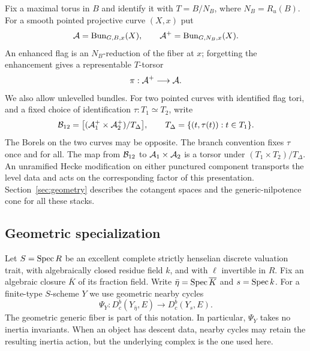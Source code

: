 Fix a maximal torus in $B$ and identify it with $T=B/N_B$, where
$N_B=R_u(B)$.  For a smooth pointed projective curve $(X,x)$ put
\[
 \mathcal A=\operatorname{Bun}_{G,B,x}(X),\qquad
 \mathcal A^+=\operatorname{Bun}_{G,N_B,x}(X).
\]
An enhanced flag is an $N_B$-reduction of the fiber at $x$; forgetting the
enhancement gives a representable $T$-torsor
\begin{equation}\label{eq:found-level-torsor}
                             \pi:\mathcal A^+\longrightarrow\mathcal A.
\end{equation}
We also allow unlevelled bundles.  For two pointed curves with identified
flag tori, and a fixed choice of identification $\tau:T_1\simeq T_2$, write
\begin{equation}\label{eq:found-node-quotient}
 \mathcal B_{12}=\bigl[(\mathcal A_1^+\times\mathcal A_2^+)/T_{\Delta}\bigr],
 \qquad T_{\Delta}=\{(t,\tau(t)):t\in T_1\}.
\end{equation}
The Borels on the two curves may be opposite.  The branch convention fixes
$\tau$ once and for all.  The map from $\mathcal B_{12}$ to
$\mathcal A_1\times\mathcal A_2$ is a torsor under $(T_1\times T_2)/T_{\Delta}$.
An unramified Hecke modification on either punctured component transports
the level data and acts on the corresponding factor of this presentation.
Section~\ref{sec:geometry} describes the cotangent spaces and the
generic-nilpotence cone for all these stacks.

\subsection{Geometric specialization}

Let $S=\operatorname{Spec} R$ be an excellent complete strictly henselian discrete
valuation trait, with algebraically closed residue field $k$, and with
$\ell$ invertible in $R$.  Fix an algebraic closure $\overline K$ of its
fraction field.  Write $\bar\eta=\operatorname{Spec}\overline K$ and $s=\operatorname{Spec} k$.
For a finite-type $S$-scheme $Y$ we use geometric nearby cycles
\[
                \Psi_Y:D^b_c(Y_{\bar\eta},E)
                                  \longrightarrow D^b_c(Y_s,E).
\]
The geometric generic fiber is part of this notation.  In particular,
$\Psi_Y$ takes no inertia invariants.  When an object has descent data,
nearby cycles may retain the resulting inertia action, but the underlying
complex is the one used here.

